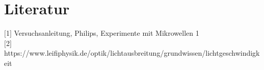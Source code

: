 \section{Literatur}
$[$1$]$ Versuchsanleitung, Philips, Experimente mit Mikrowellen 1\\
$[$2$]$ https://www.leifiphysik.de/optik/lichtausbreitung/grundwissen/lichtgeschwindigkeit
























